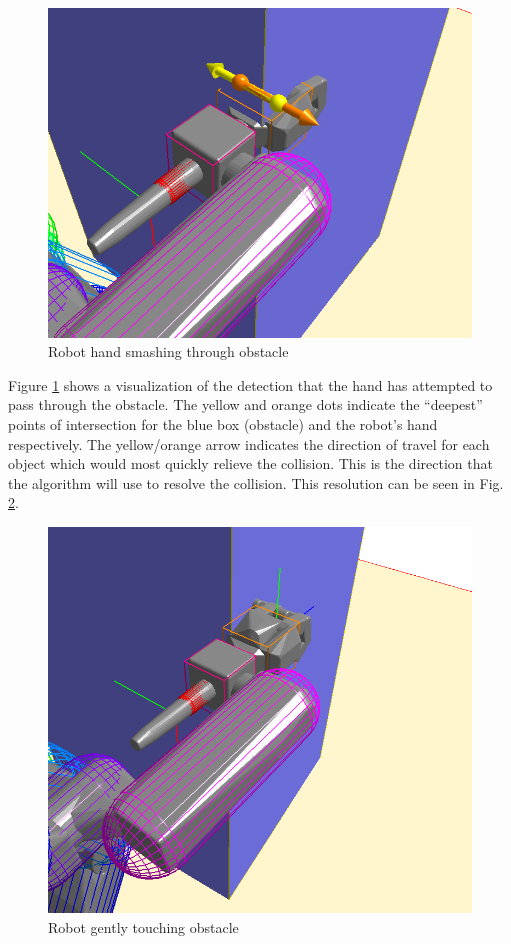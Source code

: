 \documentclass[letterpaper, 10 pt, conference]{ieeeconf}  %
\begin{document}
\begin{figure}[h]
    \includegraphics[width=\columnwidth]{pictures/grab_collide_closeup}
    \caption{Robot hand smashing through obstacle}
    \label{fig:grab_collide}
\end{figure}

Figure \ref{fig:grab_collide} shows a visualization of the detection that the hand has attempted to pass through the obstacle. The yellow and orange dots indicate the ``deepest'' points of intersection for the blue box (obstacle) and the robot's hand respectively. The yellow/orange arrow indicates the direction of travel for each object which would most quickly relieve the collision. This is the direction that the algorithm will use to resolve the collision. This resolution can be seen in Fig. \ref{fig:grab_resolved}.

\begin{figure}[h]
    \includegraphics[width=\columnwidth]{pictures/grab_resolved_closeup}
    \caption{Robot gently touching obstacle}
    \label{fig:grab_resolved}
\end{figure}
\end{document}
